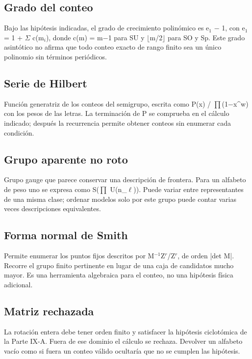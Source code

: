 \documentclass[11pt,a4paper]{article}
\begin{document}
\subsection*{Grado del conteo}
Bajo las hipótesis indicadas, el grado de crecimiento polinómico es e\ensuremath{{}_{1}} \ensuremath{-} 1, con e\ensuremath{{}_{1}} = 1 + \ensuremath{\Sigma} c(m\ensuremath{{}_{i}}), donde c(m) = m\ensuremath{-}1 para SU y \ensuremath{\lfloor}m/2\ensuremath{\rfloor} para SO y Sp. Este grado asintótico no afirma que todo conteo exacto de rango finito sea un único polinomio sin términos periódicos.

\subsection*{Serie de Hilbert}
Función generatriz de los conteos del semigrupo, escrita como P(x) / \ensuremath{\prod}(1\ensuremath{-}x\textasciicircum{}w) con los pesos de las letras. La terminación de P se comprueba en el cálculo indicado; después la recurrencia permite obtener conteos sin enumerar cada condición.

\subsection*{Grupo aparente no roto}
Grupo gauge que parece conservar una descripción de frontera. Para un alfabeto de peso uno se expresa como S(\ensuremath{\prod} U(n\_\ensuremath{\ell})). Puede variar entre representantes de una misma clase; ordenar modelos solo por este grupo puede contar varias veces descripciones equivalentes.

\subsection*{Forma normal de Smith}
Permite enumerar los puntos fijos descritos por M\ensuremath{{}^{-1}}Z\ensuremath{{}^{r}}/Z\ensuremath{{}^{r}}, de orden |det M|. Recorre el grupo finito pertinente en lugar de una caja de candidatos mucho mayor. Es una herramienta algebraica para el conteo, no una hipótesis física adicional.

\subsection*{Matriz rechazada}
La rotación entera debe tener orden finito y satisfacer la hipótesis ciclotómica de la Parte IX-A. Fuera de ese dominio el cálculo se rechaza. Devolver un alfabeto vacío como si fuera un conteo válido ocultaría que no se cumplen las hipótesis.
\end{document}
